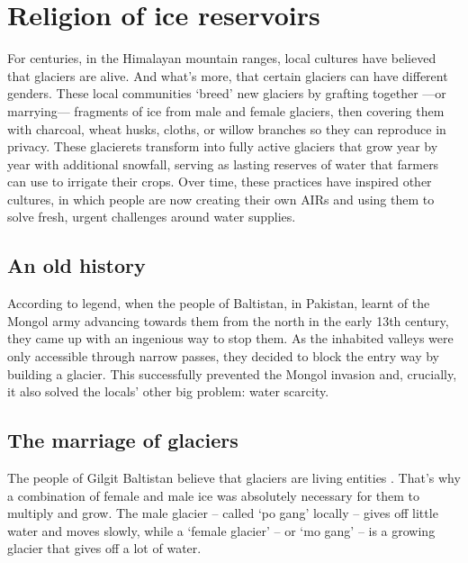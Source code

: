 \chapter{Religion of ice reservoirs}


For centuries, in the Himalayan mountain ranges, local cultures have believed that glaciers are alive. And
what’s more, that certain glaciers can have different genders. These local communities ‘breed’
new glaciers by grafting together —or marrying— fragments of ice from male and female glaciers, then covering them
with charcoal, wheat husks, cloths, or willow branches so they can reproduce in privacy. These glacierets
transform into fully active glaciers that grow year by year with additional snowfall, serving as lasting
reserves of water that farmers can use to irrigate their crops. Over time, these practices have inspired
other cultures, in which people are now creating their own \ac{AIRs} and using them to solve fresh, urgent challenges around water supplies.

\section{An old history}

According to legend, when the people of Baltistan, in Pakistan, learnt of the Mongol army advancing towards
them from the north in the early 13th century, they came up with an ingenious way to stop them. As the inhabited
valleys were only accessible through narrow passes, they decided to block the entry way by building a glacier.
This successfully prevented the Mongol invasion and, crucially, it also solved the locals’ other big problem:
water scarcity.

\section{The marriage of glaciers}

The people of Gilgit Baltistan believe that glaciers are living entities
\citep{shabinafarazGlacierMarriagesPakistan2020, khanMarriageGlaciersPrzekroj2020}. That’s why a combination of
female and male ice was absolutely necessary for them to multiply and grow. The male glacier – called ‘po gang’ locally – gives off little water and moves slowly, while a ‘female glacier’ – or ‘mo gang’ – is a growing glacier that gives off a lot of water.

